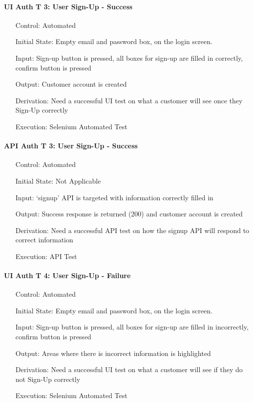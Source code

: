 \documentclass[12pt, titlepage]{article}
\begin{document}
\paragraph*{UI Auth T 3: User Sign-Up - Success}
\begin{itemize}
	\item[Control:] Automated
	\item[Initial State:] Empty email and password box, on the login screen.
	\item[Input:] Sign-up button is pressed, all boxes for sign-up are filled in correctly, confirm button is pressed
	\item[Output:] Customer account is created
	\item[Derivation:] Need a successful UI test on what a customer will see once they Sign-Up correctly
	\item[Execution:] Selenium Automated Test
\end{itemize}

\paragraph*{API Auth T 3: User Sign-Up - Success}
\begin{itemize}
	\item[Control:] Automated
	\item[Initial State:] Not Applicable
	\item[Input:] `signup' API is targeted with information correctly filled in
	\item[Output:] Success response is returned (200) and customer account is created
	\item[Derivation:] Need a successful API test on how the signup API will respond to correct information
	\item[Execution:] API Test
\end{itemize}

\paragraph*{UI Auth T 4: User Sign-Up - Failure}
\begin{itemize}
	\item[Control:] Automated
	\item[Initial State:] Empty email and password box, on the login screen.
	\item[Input:] Sign-up button is pressed, all boxes for sign-up are filled in incorrectly, confirm button is pressed
	\item[Output:] Areas where there is incorrect information is highlighted
	\item[Derivation:] Need a successful UI test on what a customer will see if they do not Sign-Up correctly
	\item[Execution:] Selenium Automated Test
\end{itemize}
\end{document}
